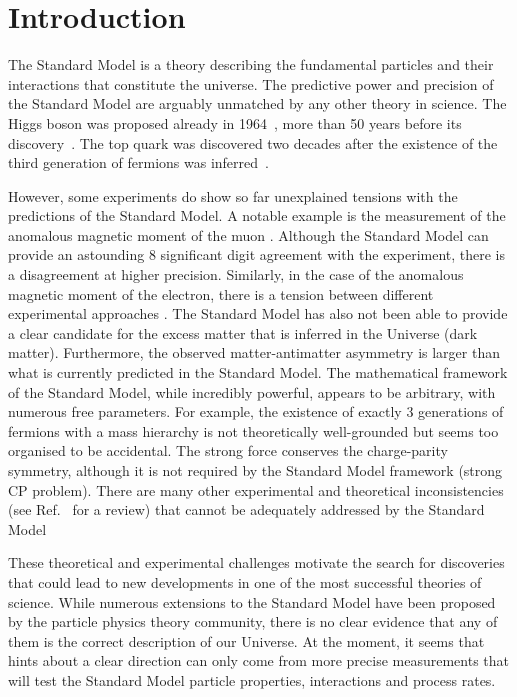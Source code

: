 \chapter{Introduction}\label{sec:introduction}

The Standard Model is a theory describing the fundamental particles and their interactions that constitute the universe.
The predictive power and precision of the Standard Model are arguably unmatched by any other theory in science.
The Higgs boson was proposed already in 1964~\cite{PhysRevLett.13.508}, more than 50 years before its discovery~\cite{ATLAS:2012yve,CMS:2012qbp}.
The top quark was discovered \cite{PhysRevLett.74.2632,PhysRevLett.74.2626} two decades after the existence of the third generation of fermions was inferred~\cite{HARARI1975265}.

However, some experiments do show so far unexplained tensions with the predictions of the Standard Model. 
A notable example is the measurement of the anomalous magnetic moment of the muon \cite{PhysRevLett.126.141801}.
Although the Standard Model can provide an astounding 8 significant digit agreement with the experiment, there is a disagreement at higher precision.
Similarly, in the case of the anomalous magnetic moment of the electron, there is a tension between different experimental approaches \cite{PhysRevLett.100.120801,Morel:2020dww,Li:2021koa}.
The Standard Model has also not been able to provide a clear candidate for the excess matter that is inferred in the Universe (dark matter).
Furthermore, the observed matter-antimatter asymmetry 
is larger than what is currently predicted in the Standard Model.
The mathematical framework of the Standard Model, while incredibly powerful, appears to be arbitrary, with numerous free parameters.
For example, the existence of exactly 3 generations of fermions with a mass hierarchy is not theoretically well-grounded but seems too organised to be accidental.
The strong force conserves the charge-parity symmetry, although it is not required by the Standard Model framework (strong CP problem).
There are many other experimental and theoretical inconsistencies (see Ref.~\cite{Ellis:2002wba} for a review) that cannot be adequately addressed by the Standard Model

These theoretical and experimental challenges motivate the search for discoveries that could lead to new developments in one of the most successful theories of science.
While numerous extensions to the Standard Model have been proposed by the particle physics theory community, there is no clear evidence that any of them is the correct description of our Universe.
At the moment, it seems that hints about a clear direction can only come from more precise measurements that will test the Standard Model particle properties, interactions and process rates.

